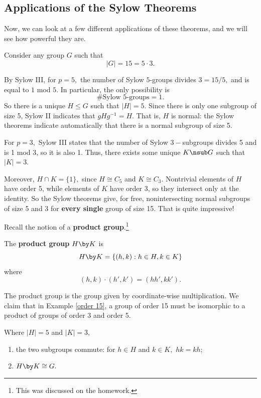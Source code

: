 \subsection{Applications of the Sylow Theorems}

Now, we can look at a few different applications of these theorems, and we will see how powerful they are.

\begin{example}\label{order 15}
Consider any group $G$ such that \[|G| = 15 = 5 \cdot 3.\] 

By Sylow III, for $p = 5,$ the number of Sylow $5$-groups divides $3 = 15/5,$ and is equal to $1$ mod $5.$ In particular, the only possibility is \[\# \text{Sylow 5-groups} = 1.\] So there is a unique $H \leq G$ such that $|H| = 5.$ Since there is only one subgroup of size 5, Sylow II indicates that $gHg^{-1} = H.$ That is, $H$ is normal: the Sylow theorems indicate automatically that there is a normal subgroup of size 5.

For $p = 3,$ Sylow III states that the number of Sylow $3-$subgroups divides 5 and is 1 mod 3, so it is also 1. Thus, there exists some unique $K \nsub G$ such that $|K| = 3$.
\end{example}

Moreover, $H \cap K = \{1\},$ since $H \cong C_5$ and $K \cong C_3.$ Nontrivial elements of $H$ have order 5, while elements of $K$ have order 3, so they intersect only at the identity. So the Sylow theorems give, for free, nonintersecting normal subgroups of size 5 and 3 for \textbf{every single} group of size 15. That is quite impressive! 

Recall the notion of a \textbf{product group}.\footnote{This was discussed on the homework.}

\begin{definition}
The \textbf{product group} $H \by K$ is 
\[
H \by K = \{(h, k) : h \in H, k \in K\}
\]
where 
\[
(h, k) \cdot (h', k') = (hh', kk').
\]
\end{definition}

The product group is the group given by coordinate-wise multiplication. We claim that in Example \ref{order 15}, a group of order 15 must be isomorphic to a product of groups of order 3 and order 5.


\begin{proposition}\label{order 15}



Where $|H| = 5$ and $|K| = 3,$

 \begin{enumerate}[label = (\alph*)]
    \item the two subgroups commute: for $h \in H$ and $k \in K,$ $hk = kh$;
    \item $H \by K \cong G.$
\end{enumerate}
\end{proposition}

